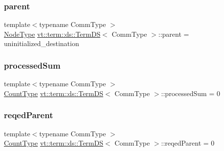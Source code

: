 \mbox{\label{structvt_1_1term_1_1ds_1_1_term_d_s_a904c12ccc672c4849af1cc6e89a91c54}} 
\subsubsection{\texorpdfstring{parent}{parent}}
{\footnotesize\ttfamily template$<$typename Comm\+Type $>$ \\
\hyperlink{namespacevt_a866da9d0efc19c0a1ce79e9e492f47e2}{Node\+Type} \hyperlink{structvt_1_1term_1_1ds_1_1_term_d_s}{vt\+::term\+::ds\+::\+Term\+DS}$<$ Comm\+Type $>$\+::parent = uninitialized\+\_\+destination\hspace{0.3cm}{\ttfamily [protected]}}

\mbox{\label{structvt_1_1term_1_1ds_1_1_term_d_s_ad82335b84b7ac759e94fa524c59b03d9}} 
\subsubsection{\texorpdfstring{processed\+Sum}{processedSum}}
{\footnotesize\ttfamily template$<$typename Comm\+Type $>$ \\
\hyperlink{structvt_1_1term_1_1ds_1_1_term_d_s_a54f4ebd7e1ecb59c32c0f5b03ef9f20b}{Count\+Type} \hyperlink{structvt_1_1term_1_1ds_1_1_term_d_s}{vt\+::term\+::ds\+::\+Term\+DS}$<$ Comm\+Type $>$\+::processed\+Sum = 0\hspace{0.3cm}{\ttfamily [protected]}}

\mbox{\label{structvt_1_1term_1_1ds_1_1_term_d_s_af2aced5d22eef80e3e4d1cf761f52693}} 
\subsubsection{\texorpdfstring{reqed\+Parent}{reqedParent}}
{\footnotesize\ttfamily template$<$typename Comm\+Type $>$ \\
\hyperlink{structvt_1_1term_1_1ds_1_1_term_d_s_a54f4ebd7e1ecb59c32c0f5b03ef9f20b}{Count\+Type} \hyperlink{structvt_1_1term_1_1ds_1_1_term_d_s}{vt\+::term\+::ds\+::\+Term\+DS}$<$ Comm\+Type $>$\+::reqed\+Parent = 0\hspace{0.3cm}{\ttfamily [protected]}}

